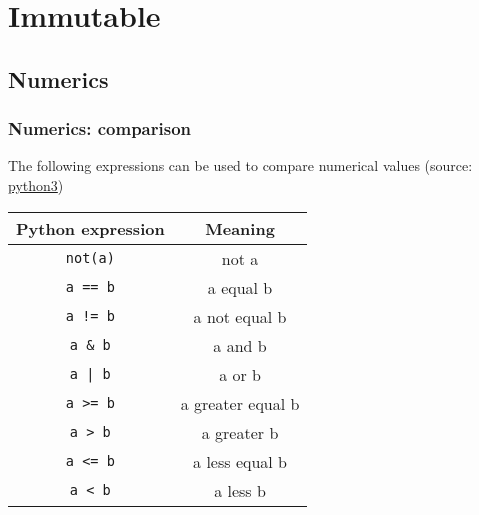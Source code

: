 \section{Immutable}
\subsection{Numerics}

\begin{frame}[fragile]
\frametitle{Numerics: comparison}
\begin{center}
    The following expressions can be used to compare numerical values (source: \href{https://docs.python.org/3/library/stdtypes.html}{python3})

\vspace{1em}
\begin{tabular}{cc}
Python expression & Meaning\\
\hline
\verb+not(a)+ & not a\\
\verb+a == b+ & a equal b\\
\verb+a != b+ & a not equal b\\
\verb+a & b+ & a and b\\
\verb+a | b+ & a or b\\
\verb+a >= b+ & a greater equal b\\
\verb+a > b+ & a greater b\\
\verb+a <= b+ & a less equal b\\
\verb+a < b+ & a less b\\
\end{tabular}
\end{center}
\end{frame}


